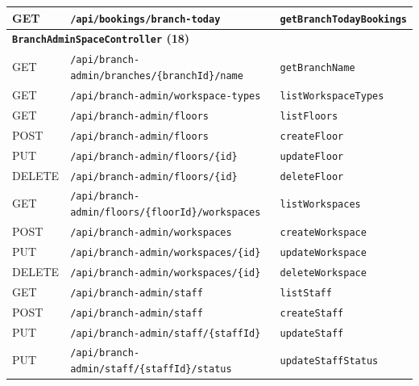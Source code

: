 {\begin{longtable}{|p{1.5cm}|p{7.3cm}|p{5.0cm}|}
\hline
GET & \texttt{/\allowbreak api/\allowbreak bookings/\allowbreak branch-today} & \texttt{getBranchTodayBookings} \\
\hline
\multicolumn{3}{|l|}{\textbf{\texttt{BranchAdminSpaceController} (18)}} \\
\hline
GET & \texttt{/\allowbreak api/\allowbreak branch-admin/\allowbreak branches/\allowbreak \{branchId\}/\allowbreak name} & \texttt{getBranchName} \\
\hline
GET & \texttt{/\allowbreak api/\allowbreak branch-admin/\allowbreak workspace-types} & \texttt{listWorkspaceTypes} \\
\hline
GET & \texttt{/\allowbreak api/\allowbreak branch-admin/\allowbreak floors} & \texttt{listFloors} \\
\hline
POST & \texttt{/\allowbreak api/\allowbreak branch-admin/\allowbreak floors} & \texttt{createFloor} \\
\hline
PUT & \texttt{/\allowbreak api/\allowbreak branch-admin/\allowbreak floors/\allowbreak \{id\}} & \texttt{updateFloor} \\
\hline
DELETE & \texttt{/\allowbreak api/\allowbreak branch-admin/\allowbreak floors/\allowbreak \{id\}} & \texttt{deleteFloor} \\
\hline
GET & \texttt{/\allowbreak api/\allowbreak branch-admin/\allowbreak floors/\allowbreak \{floorId\}/\allowbreak workspaces} & \texttt{listWorkspaces} \\
\hline
POST & \texttt{/\allowbreak api/\allowbreak branch-admin/\allowbreak workspaces} & \texttt{createWorkspace} \\
\hline
PUT & \texttt{/\allowbreak api/\allowbreak branch-admin/\allowbreak workspaces/\allowbreak \{id\}} & \texttt{updateWorkspace} \\
\hline
DELETE & \texttt{/\allowbreak api/\allowbreak branch-admin/\allowbreak workspaces/\allowbreak \{id\}} & \texttt{deleteWorkspace} \\
\hline
GET & \texttt{/\allowbreak api/\allowbreak branch-admin/\allowbreak staff} & \texttt{listStaff} \\
\hline
POST & \texttt{/\allowbreak api/\allowbreak branch-admin/\allowbreak staff} & \texttt{createStaff} \\
\hline
PUT & \texttt{/\allowbreak api/\allowbreak branch-admin/\allowbreak staff/\allowbreak \{staffId\}} & \texttt{updateStaff} \\
\hline
PUT & \texttt{/\allowbreak api/\allowbreak branch-admin/\allowbreak staff/\allowbreak \{staffId\}/\allowbreak status} & \texttt{updateStaffStatus} \\

\end{longtable}}
